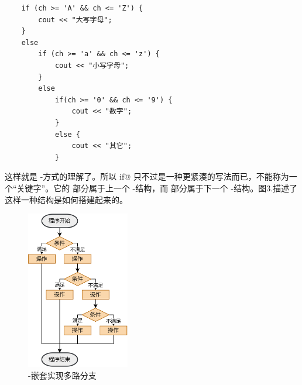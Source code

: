 \begin{lstlisting}
    if (ch >= 'A' && ch <= 'Z') {
        cout << "大写字母";
    }
    else
        if (ch >= 'a' && ch <= 'z') {
            cout << "小写字母";
        }
        else
            if(ch >= '0' && ch <= '9') {
                cout << "数字";
            }
            else {
                cout << "其它";
            }
\end{lstlisting}
这样就是 \lstinline@if@-\lstinline@else@ 方式的理解了。所以 \lstinline@else if@ 只不过是一种更紧湊的写法而已，不能称为一个``关键字''。它的 \lstinline@else@ 部分属于上一个 \lstinline@if@-\lstinline@else@ 结构，而 \lstinline@if@ 部分属于下一个 \lstinline@if@-\lstinline@else@ 结构。图3.描述了这样一种结构是如何搭建起来的。\par
\begin{figure}[htbp]
    \centering
    \includegraphics[width=0.4\textwidth]{../images/generalized_parts/03_if_elseif_else.png}
    \caption{\lstinline@if@-\lstinline@else@ 嵌套实现多路分支}
\end{figure}
